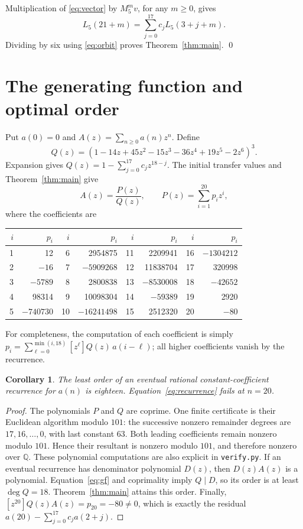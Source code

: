 \documentclass[11pt]{article}
\newtheorem{corollary}[theorem]{Corollary}
\begin{document}
Multiplication of \eqref{eq:vector} by $M_5^m v$, for any $m\geq0$,
gives
\[
L_5(21+m)=\sum_{j=0}^{17}c_jL_5(3+j+m).
\]
Dividing by six using \eqref{eq:orbit} proves Theorem~\ref{thm:main}.
\qed

\section{The generating function and optimal order}
Put $a(0)=0$ and $A(z)=\sum_{n\geq0}a(n)z^n$. Define
\[
Q(z)=(1-14z+45z^2-15z^3-36z^4+19z^5-2z^6)^3.
\]
Expansion gives $Q(z)=1-\sum_{j=0}^{17}c_jz^{18-j}$.
The initial transfer values and Theorem~\ref{thm:main} give
\begin{equation}\label{eq:gf}
A(z)=\frac{P(z)}{Q(z)},\qquad
P(z)=\sum_{i=1}^{20}p_i z^i,
\end{equation}
where the coefficients are
\begin{center}
\begin{tabular}{rr@{\qquad}rr@{\qquad}rr@{\qquad}rr}
\toprule
$i$&$p_i$&$i$&$p_i$&$i$&$p_i$&$i$&$p_i$\\
\midrule
1&12&6&2954875&11&2209941&16&$-1304212$\\
2&$-16$&7&$-5909268$&12&11838704&17&320998\\
3&$-5789$&8&2800838&13&$-8530008$&18&$-42652$\\
4&98314&9&10098304&14&$-59389$&19&2920\\
5&$-740730$&10&$-16241498$&15&2512320&20&$-80$\\
\bottomrule
\end{tabular}
\end{center}
For completeness, the computation of each coefficient is simply
$p_i=\sum_{\ell=0}^{\min(i,18)}[z^\ell]Q(z)\,a(i-\ell)$;
all higher coefficients vanish by the recurrence.

\begin{corollary}\label{cor:minimal}
The least order of an eventual rational constant-coefficient recurrence
for $a(n)$ is eighteen. Equation~\eqref{eq:recurrence} fails at $n=20$.
\end{corollary}
\begin{proof}
The polynomials $P$ and $Q$ are coprime. One finite certificate is their
Euclidean algorithm modulo $101$: the successive nonzero remainder
degrees are $17,16,\ldots,0$, with last constant $63$.
Both leading coefficients remain nonzero modulo $101$.
Hence their resultant is nonzero modulo $101$, and therefore nonzero
over $\mathbb Q$. These polynomial computations are also explicit in
\texttt{verify.py}.
If an eventual recurrence has denominator polynomial $D(z)$, then
$D(z)A(z)$ is a polynomial. Equation~\eqref{eq:gf} and coprimality
imply $Q\mid D$, so its order is at least $\deg Q=18$.
Theorem~\ref{thm:main} attains this order.
Finally, $[z^{20}]Q(z)A(z)=p_{20}=-80\ne0$, which is exactly the
residual $a(20)-\sum_{j=0}^{17}c_j a(2+j)$.
\end{proof}
\end{document}
